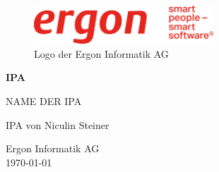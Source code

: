 \begin{titlepage}

    \begin{figure}
        \begin{center}
            \includegraphics[width=0.6\textwidth]{ressourcen/ergon_logo_gross}
            \captionsetup{textformat=empty, labelformat=empty}
            \caption[Logo der Ergon Informatik AG]{Logo der Ergon Informatik AG}\label{fig:ergon-logo-gross}
        \end{center}
    \end{figure}
    \begin{center}
        \vspace*{2cm}
        \Huge
        \textbf{IPA}

        \vspace{0.5cm}
        \Large
        NAME DER IPA

        \vfill

        \Large
        IPA von Niculin Steiner

        \vspace*{3cm}

        \large
        Ergon Informatik AG\\
        \today\\

    \end{center}
\end{titlepage}
